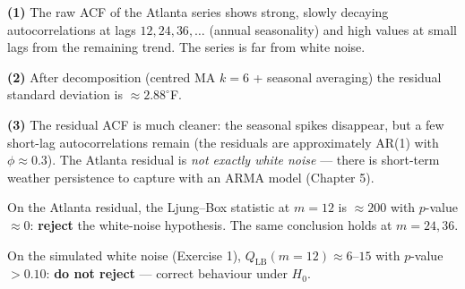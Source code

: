 \documentclass[a4paper,11pt]{article}
\begin{document}
\begin{exercise}\end{exercise}

\begin{solution}
\textbf{(1)} The raw ACF of the Atlanta series shows strong, slowly
decaying autocorrelations at lags $12, 24, 36, \dots$ (annual
seasonality) and high values at small lags from the remaining trend.
The series is far from white noise.

\textbf{(2)} After decomposition (centred MA $k = 6$ + seasonal
averaging) the residual standard deviation is $\approx 2.88^\circ$F.

\textbf{(3)} The residual ACF is much cleaner: the seasonal spikes
disappear, but a few short-lag autocorrelations remain (the
residuals are approximately AR(1) with $\phi \approx 0.3$). The
Atlanta residual is \emph{not exactly white noise} — there is short-term
weather persistence to capture with an ARMA model (Chapter 5).
\end{solution}

\begin{exercise}\end{exercise}

\begin{solution}
On the Atlanta residual, the Ljung--Box statistic at $m = 12$ is
$\approx 200$ with $p$-value $\approx 0$: \textbf{reject} the
white-noise hypothesis. The same conclusion holds at $m = 24, 36$.

On the simulated white noise (Exercise 1), $Q_{\text{LB}}(m=12)
\approx 6$--$15$ with $p$-value $> 0.10$: \textbf{do not reject} —
correct behaviour under $H_0$.
\end{solution}
\end{document}
